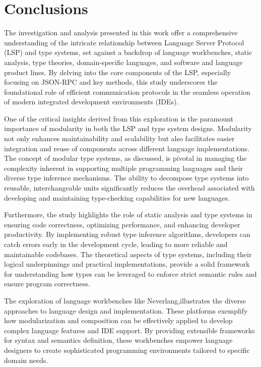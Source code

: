 \chapter{Conclusions}\label{chap:Conclusions}

The investigation and analysis presented in this work offer a comprehensive understanding of the intricate relationship between Language Server Protocol (LSP) and type systems, set against a backdrop of language workbenches, static analysis, type theories, domain-specific languages, and software and language product lines. By delving into the core components of the LSP, especially focusing on JSON-RPC and key methods, this study underscores the foundational role of efficient communication protocols in the seamless operation of modern integrated development environments (IDEs).

One of the critical insights derived from this exploration is the paramount importance of modularity in both the LSP and type system designs. Modularity not only enhances maintainability and scalability but also facilitates easier integration and reuse of components across different language implementations. The concept of modular type systems, as discussed, is pivotal in managing the complexity inherent in supporting multiple programming languages and their diverse type inference mechanisms. The ability to decompose type systems into reusable, interchangeable units significantly reduces the overhead associated with developing and maintaining type-checking capabilities for new languages.

Furthermore, the study highlights the role of static analysis and type systems in ensuring code correctness, optimizing performance, and enhancing developer productivity. By implementing robust type inference algorithms, developers can catch errors early in the development cycle, leading to more reliable and maintainable codebases. The theoretical aspects of type systems, including their logical underpinnings and practical implementations, provide a solid framework for understanding how types can be leveraged to enforce strict semantic rules and ensure program correctness.

The exploration of language workbenches like Neverlang,illustrates the diverse approaches to language design and implementation. These platforms exemplify how modularization and composition can be effectively applied to develop complex language features and IDE support. By providing extensible frameworks for syntax and semantics definition, these workbenches empower language designers to create sophisticated programming environments tailored to specific domain needs.

